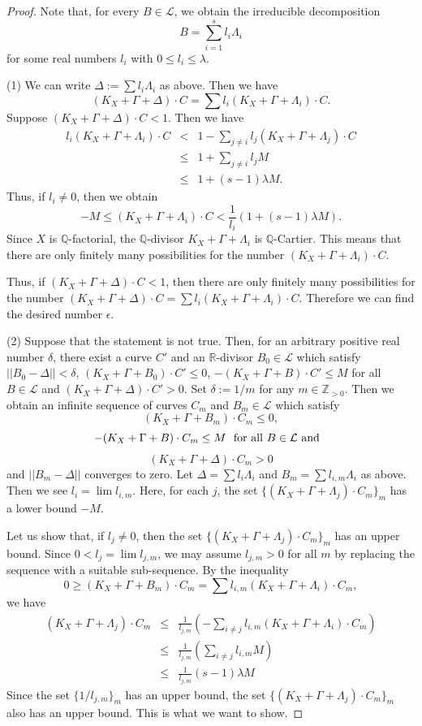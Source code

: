 \documentclass[12pt,twoside]{amsart}
\theoremstyle{definition}
\newcommand{\Q}{$\mathbb{Q}$}
\begin{document}
\begin{proof}
Note that, for every $B\in \mathcal{L}$, 
we obtain the irreducible decomposition  
$$B=\sum_{i=1}^s l_i\Lambda_i$$
for some real numbers $l_i$ with $0\leq l_i \leq \lambda$. 

(1)
We can write $\Delta:=\sum l_i\Lambda_i$ as above. 
Then we have 
$$(K_X+\Gamma+\Delta)\cdot C=\sum l_i(K_X+\Gamma+\Lambda_i)\cdot C.$$
Suppose $(K_X+\Gamma+\Delta)\cdot C<1$. 
Then we have 
\begin{eqnarray*}
l_i(K_X+\Gamma+\Lambda_i)\cdot C 
&<&1-\sum_{j\neq i}l_j(K_X+\Gamma+\Lambda_j)\cdot C\\
&\leq&1+\sum_{j\neq i}l_jM\\
&\leq&1+(s-1)\lambda M.
\end{eqnarray*}
Thus, if $l_i\neq 0$, then we obtain 
$$-M\leq (K_X+\Gamma+\Lambda_i)\cdot C 
<\frac{1}{l_i}(1+(s-1)\lambda M).$$
Since $X$ is \Q-factorial, the \Q-divisor $K_X+\Gamma+\Lambda_i$ 
is \Q-Cartier. 
This means that there are only finitely many possibilities 
for the number $(K_X+\Gamma+\Lambda_i)\cdot C$. 

Thus, if $(K_X+\Gamma+\Delta)\cdot C<1$, 
then there are only finitely many possibilities 
for the number 
$(K_X+\Gamma+\Delta)\cdot C=\sum l_i(K_X+\Gamma+\Lambda_i)\cdot C$. 
Therefore we can find the desired number $\epsilon$. 


(2)
Suppose that the statement is not true. 
Then, for an arbitrary positive real number $\delta$, 
there exist a curve $C'$ and an $\mathbb{R}$-divisor 
$B_0\in \mathcal{L}$ 
which satisfy $||B_0-\Delta||<\delta$, 
$(K_X+\Gamma+B_0)\cdot C'\leq 0$, 
$-(K_X+\Gamma+B)\cdot C' \leq M$ for 
all $B\in \mathcal{L}$ and
$(K_X+\Gamma+\Delta)\cdot C'> 0.$ 
Set $\delta:=1/m$ for any $m\in \mathbb{Z}_{>0}.$ 
Then we obtain an infinite sequence of 
curves $C_m$ and $B_m\in \mathcal{L}$ which satisfy 
$$(K_X+\Gamma+B_m)\cdot C_m\leq 0,$$
$$-(K_X+\Gamma+B)\cdot C_m \leq M\,\,\,\,
{\rm for\,\,all\,\,} B\in \mathcal{L} {\rm \,\,and}
\,\,\,\,$$
$$(K_X+\Gamma+\Delta)\cdot C_m>0$$
and $||B_m-\Delta||$ converges to zero. 
Let $\Delta=\sum l_i\Lambda_i$ and $B_m=\sum l_{i,m}\Lambda_i$ as above. 
Then we see $l_i=\lim l_{i,m}$. 
Here, for each $j$, the set 
$\{(K_X+\Gamma+\Lambda_j)\cdot C_m\}_{m}$ has a lower bound $-M$. 

Let us show that, 
if $l_j\neq 0$, then the set $\{(K_X+\Gamma+\Lambda_j)\cdot C_m\}_{m}$ has an upper bound. 
Since $0<l_j=\lim l_{j,m}$, we may assume 
$l_{j,m}>0$ for all $m$ by replacing the sequence with 
a suitable sub-sequence. 
By the inequality 
$$0 \geq (K_X+\Gamma+B_m)\cdot C_m
=\sum l_{i,m}(K_X+\Gamma+\Lambda_i)\cdot C_m,$$
we have 
\begin{eqnarray*}
(K_X+\Gamma+\Lambda_j)\cdot C_m&\leq& \frac{1}{l_{j,m}}
(-\sum_{i\neq j} l_{i,m}(K_X+\Gamma+\Lambda_i)\cdot C_m)\\
&\leq&\frac{1}{l_{j,m}}
(\sum_{i\neq j} l_{i,m}M)\\
&\leq&\frac{1}{l_{j,m}}
(s-1)\lambda M
\end{eqnarray*}
Since the set $\{1/l_{j,m}\}_m$ has an upper bound, 
the set $\{(K_X+\Gamma+\Lambda_j)\cdot C_m\}_m$ also has an upper bound. 
This is what we want to show. 


\end{proof}
\end{document}
